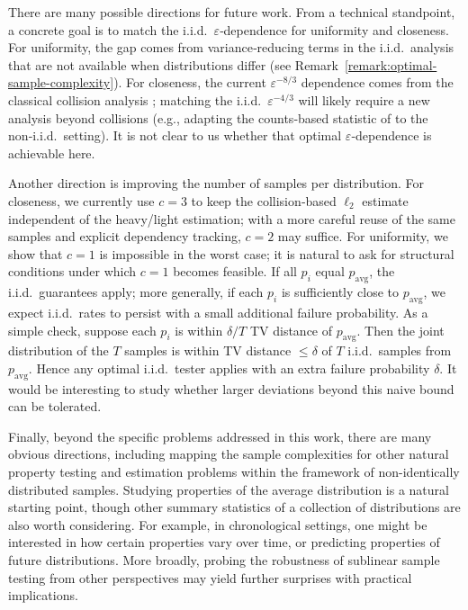 \documentclass[10pt]{article} %
\theoremstyle{plain}
\begin{document}
There are many possible directions for future work. From a technical standpoint, a concrete goal is to match the i.i.d.\ $\varepsilon$‑dependence for uniformity and closeness. For uniformity, the gap comes from variance‑reducing terms in the i.i.d.\ analysis that are not available when distributions differ (see Remark~\ref{remark:optimal-sample-complexity}). For {closeness}, the current $\varepsilon^{-8/3}$ dependence comes from the classical collision analysis \citep{batu2013testing}; matching the i.i.d.\ $\varepsilon^{-4/3}$ will likely require a new analysis beyond collisions (e.g., adapting the counts‑based statistic of \citet{chan2014optimal} to the non‑i.i.d.\ setting). It is not clear to us whether that optimal $\varepsilon$‑dependence is achievable here.



Another direction is improving the number of samples per distribution. For {closeness}, we currently use $c=3$ to keep the collision‑based $\ell_2$ estimate independent of the heavy/light estimation; with a more careful reuse of the same samples and explicit dependency tracking, $c=2$ may suffice. For {uniformity}, we show that $c=1$ is impossible in the worst case; it is natural to ask for structural conditions under which $c=1$ becomes feasible. If all $p_i$ equal $p_{\mathrm{avg}}$, the i.i.d.\ guarantees apply; more generally, if each $p_i$ is sufficiently close to $p_{\mathrm{avg}}$, we expect i.i.d.\ rates to persist with a small additional failure probability. As a simple check, suppose each $p_i$ is within $\delta/T$ TV distance of $p_{\mathrm{avg}}$. Then the joint distribution of the $T$ samples is within TV distance $\le \delta$ of $T$ i.i.d.\ samples from $p_{\mathrm{avg}}$. Hence any optimal i.i.d.\ tester applies with an extra failure probability $\delta$. It would be  interesting to study whether larger deviations beyond this naive bound can be tolerated.

Finally, beyond the specific problems addressed in this work, there are many obvious directions, including mapping the sample complexities for other natural property testing and estimation problems within the framework of non-identically distributed samples.  Studying properties of the average distribution is a natural starting point, though other summary statistics of a collection of distributions are also worth considering. For example, in chronological settings, one might be interested in how certain properties vary  over time, or predicting properties of future distributions.  More broadly, probing the robustness of sublinear sample testing from other perspectives may yield further surprises with practical implications.
\end{document}
